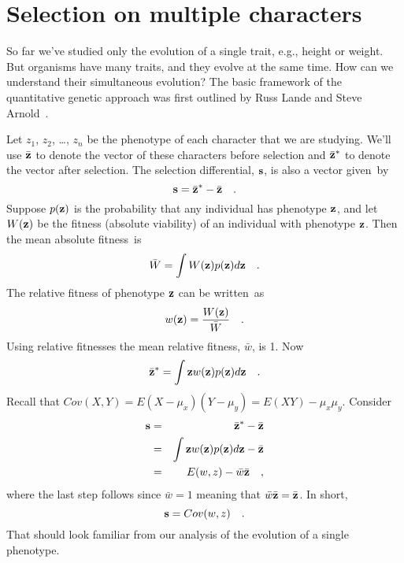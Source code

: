 \chapter{Selection on multiple characters}

So far we've studied only the evolution of a single trait, e.g.,
height or weight. But organisms have many traits, and they evolve at
the same time. How can we understand their simultaneous evolution? The
basic framework of the quantitative genetic approach was first
outlined by Russ Lande and Steve
Arnold~\cite{Lande-Arnold-1983}.

Let $z_1$, $z_2$, \dots, $z_n$ be the phenotype of each character that
we are studying. We'll use $\bar{\bf z}$ to denote the vector of these
characters before selection and $\bar{\bf z}^*$ to denote the vector after
selection. The selection differential, $\bf s$, is also a vector
given~by
\[
{\bf s} = \bar{\bf z}^* - \bar{\bf z} \quad .
\]
Suppose $p({\bf z})$ is the probability that any individual has
phenotype $\bf z$, and let $W({\bf z})$ be the fitness (absolute
viability) of an individual with phenotype $\bf z$. Then the mean
absolute fitness~is
\[
\bar W = \int W({\bf z})p({\bf z})d{\bf z} \quad .
\]
The relative fitness of phenotype $\bf z$ can be written~as
\[
w({\bf z}) = {W({\bf z}) \over \bar W} \quad .
\]
Using relative fitnesses the mean relative fitness, $\bar w$, is
1. Now
\[
\bar{\bf z}^* = \int {\bf z}w({\bf z})p({\bf z})d{\bf z} \quad .
\]
Recall that $Cov(X,Y) = E(X - \mu_x)(Y - \mu_y) = E(XY) -
\mu_x\mu_y$. Consider
\begin{eqnarray*}
{\bf s} &=& \bar{\bf z}^* - \bar{\bf z} \\
        &=& \int {\bf z}w({\bf z})p({\bf z})d{\bf z} - \bar {\bf z} \\
        &=& E(w,z) - \bar w\bar {\bf z} \quad ,
\end{eqnarray*}
where the last step follows since $\bar w = 1$ meaning that $\bar
w\bar{\bf z} = \bar{\bf z}$. In short,
\[
{\bf s} = Cov(w,z) \quad .
\]
That should look familiar from our analysis of the evolution of a
single phenotype.

